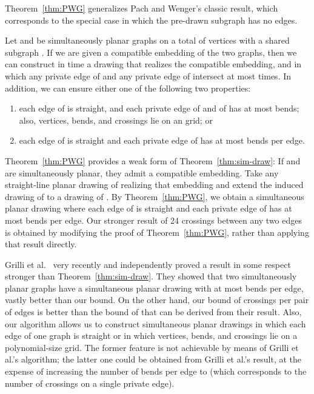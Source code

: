 \documentclass{llncs}
\begin{document}
Theorem~\ref{thm:PWG} generalizes Pach and Wenger's classic result, which corresponds to the special case in which the pre-drawn subgraph has no edges.

\begin{theorem}
\label{thm:sim-draw}
Let  and  be simultaneously planar graphs on a total of  vertices with a shared subgraph .
If we are given a compatible embedding of the two graphs, then we can construct in  time a drawing that realizes the compatible embedding, and in which
any private edge of  and any private edge of 
intersect at most  times. In addition, we can ensure either one of the following two properties:

\begin{enumerate}
\item[] each edge of  is straight, and each private edge of  and of  has at most  bends; also, vertices, bends, and crossings lie on an  grid; or
\item[] each edge of  is straight and each private edge of  has at most  bends per edge.
\end{enumerate}
\end{theorem}

 Theorem~\ref{thm:PWG} provides a weak form of Theorem~\ref{thm:sim-draw}: If  and  are simultaneously planar, they admit a compatible embedding. Take any straight-line planar drawing of  realizing that embedding and extend the induced drawing of  to a drawing of . By Theorem~\ref{thm:PWG}, we obtain a simultaneous planar drawing where each edge of  is straight and each private edge of  has at most  bends per edge. Our stronger result of 24 crossings between any two edges is  obtained by modifying the proof  of Theorem~\ref{thm:PWG}, rather than applying that result directly.


Grilli et al.~\cite{Grilli2014} very recently and independently proved a result in some respect stronger than Theorem~\ref{thm:sim-draw}. They showed that two simultaneously planar graphs have a simultaneous planar drawing with at most  bends per edge, vastly better than our  bound. On the other hand, our bound of  crossings per pair of edges is better than the bound of  that can be derived from their result. Also, our algorithm allows us to construct simultaneous planar drawings in which each edge of one graph is straight or in which vertices, bends, and crossings lie on a polynomial-size grid. The former feature is not achievable by means of Grilli et al.'s algorithm; the latter one could be obtained from Grilli et al.'s result, at the expense of increasing the number of bends per edge to  (which corresponds to the number of crossings on a single private edge).
\end{document}
